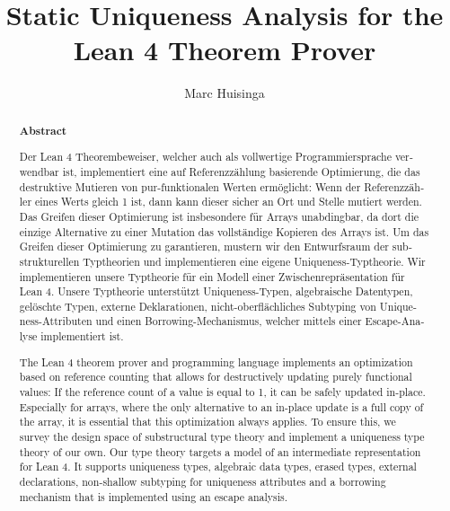 \documentclass[parskip=no,12pt,a4paper,twoside,headings=openright, fleqn]{scrreprt}
\title{Static Uniqueness Analysis for the Lean 4 Theorem Prover}
\author{Marc Huisinga}
\begin{document}
\begin{otherlanguage}{ngerman} %
\mytitlepage
\end{otherlanguage}

\begin{abstract}
\begin{center}\Huge\textbf{\textsf{Abstract}}
\end{center}
\vfill

\begin{otherlanguage}{ngerman}
Der Lean 4 Theorembeweiser, welcher auch als vollwertige Programmiersprache verwendbar ist, implementiert eine auf Referenzzählung basierende Optimierung, die das destruktive Mutieren von pur-funktionalen Werten ermöglicht: Wenn der Referenzzähler eines Werts gleich 1 ist, dann kann dieser sicher an Ort und Stelle mutiert werden. Das Greifen dieser Optimierung ist insbesondere für Arrays unabdingbar, da dort die einzige Alternative zu einer Mutation das vollständige Kopieren des Arrays ist. Um das Greifen dieser Optimierung zu garantieren, mustern wir den Entwurfsraum der substrukturellen Typtheorien und implementieren eine eigene Uniqueness-Typtheorie. Wir implementieren unsere Typtheorie für ein Modell einer Zwischenrepräsentation für Lean 4. Unsere Typtheorie unterstützt Uniqueness-Typen, algebraische Datentypen, gelöschte Typen, externe Deklarationen, nicht-oberflächliches Subtyping von Uniqueness-Attributen und einen Borrowing-Mechanismus, welcher mittels einer Escape-Analyse implementiert ist.
\end{otherlanguage}
\vfill
The Lean 4 theorem prover and programming language implements an optimization based on reference counting that allows for destructively updating purely functional values: If the reference count of a value is equal to 1, it can be safely updated in-place. Especially for arrays, where the only alternative to an in-place update is a full copy of the array, it is essential that this optimization always applies. To ensure this, we survey the design space of substructural type theory and implement a uniqueness type theory of our own. Our type theory targets a model of an intermediate representation for Lean 4. It supports uniqueness types, algebraic data types, erased types, external declarations, non-shallow subtyping for uniqueness attributes and a borrowing mechanism that is implemented using an escape analysis.
\vfill
\end{abstract}

\tableofcontents









\end{document}
